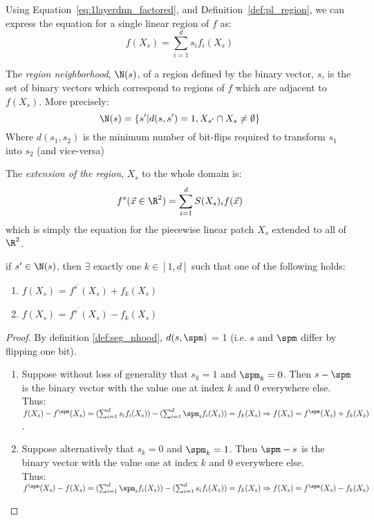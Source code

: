 Using Equation~\ref{eq:1layerdnn_factored}, and Definition~\ref{def:pl_region}, we can express the equation for a single linear region of $f$ as:
\begin{equation}
    f(X_s) = \sum_{i=1}^d s_i f_i(X_s)
\end{equation}

\begin{definition}\label{def:seg_nhood}
The \emph{region neighborhood}, $\N(s)$, of a region defined by the binary vector, $s$, is the set of binary vectors which correspond to regions of $f$ which are adjacent to $f(X_s)$. More precisely: $$\N(s) = \{ s^\prime |  d(s, s^\prime) = 1 , X_{s^\prime} \cap X_s \neq \emptyset\}$$ Where $d(s_1, s_2)$ is the minimum number of bit-flips required to transform $s_1$ into $s_2$ (and vice-versa)
\end{definition}

\begin{definition}\label{def:extension}
The \emph{extension of the region}, $X_s$ to the whole domain is:
$$f^s(\vec{x} \in \R^2) = \sum_{i=1}^{d} S(X_s)_i f(\vec{x})$$
which is simply the equation for the piecewise linear patch $X_s$ extended to all of $\R^2$.
\end{definition}



\begin{claim}\label{claim:nhood_diff}
if $s^\prime \in \N(s)$, then $\exists$ exactly one $k \in [1, d]$ such that one of the following holds: 
\begin{enumerate}
    \item $f(X_s)$ = $f^{s^\prime}(X_s) + f_k(X_s)$
    \item $f(X_s)$ = $f^{s^\prime}(X_s) - f_k(X_s)$
\end{enumerate}
\end{claim}
\begin{proof}
By definition \ref{def:seg_nhood}, $d(s, \spm)$ = 1 (i.e. $s$ and $\spm$ differ by flipping one bit). \begin{enumerate}
    \item Suppose without loss of generality that $s_k = 1$ and $\spm_k = 0$. Then $s - \spm$ is the binary vector with the value one at index $k$ and 0 everywhere else. Thus: $f(X_s) - f^{\spm}(X_s)= (\sum_{i=1}^d s_i f_i(X_s)) - (\sum_{i=1}^d \spm_i f_i(X_s)) = f_k(X_s) \Rightarrow f(X_s) = f^{\spm}(X_s) + f_k(X_s)$.
    \item Suppose alternatively that $s_k = 0$ and $\spm_k = 1$. Then $\spm - s$ is the binary vector with the value one at index $k$ and 0 everywhere else. \\Thus: $f^{\spm}(X_s) - f(X_s)= (\sum_{i=1}^d \spm_i f_i(X_s)) - (\sum_{i=1}^d s_i f_i(X_s)) = f_k(X_s) \Rightarrow f(X_s) = f^{\spm}(X_s) - f_k(X_s)$
\end{enumerate} 
\end{proof}

